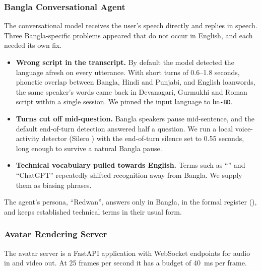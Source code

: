 \subsubsection{Bangla Conversational Agent}

The conversational model \cite{geminilive} receives the user's speech directly and replies in speech. Three Bangla-specific problems appeared that do not occur in English, and each needed its own fix.

\begin{itemize}
    \item \textbf{Wrong script in the transcript.} By default the model detected the language afresh on every utterance. With short turns of 0.6--1.8 seconds, phonetic overlap between Bangla, Hindi and Punjabi, and English loanwords, the same speaker's words came back in Devanagari, Gurmukhi and Roman script within a single session. We pinned the input language to \texttt{bn-BD}.
    \item \textbf{Turns cut off mid-question.} Bangla speakers pause mid-sentence, and the default end-of-turn detection answered half a question. We run a local voice-activity detector (Silero \cite{silero2021}) with the end-of-turn silence set to 0.55 seconds, long enough to survive a natural Bangla pause.
    \item \textbf{Technical vocabulary pulled towards English.} Terms such as ``'' and ``ChatGPT'' repeatedly shifted recognition away from Bangla. We supply them as biasing phrases.
\end{itemize}

\noindent
The agent's persona, ``Redwan'', answers only in Bangla, in the formal register (), and keeps established technical terms in their usual form.

\vspace{0.5em}

\subsubsection{Avatar Rendering Server}

The avatar server is a FastAPI application with WebSocket endpoints for audio in and video out. At 25 frames per second it has a budget of 40~ms per frame.

